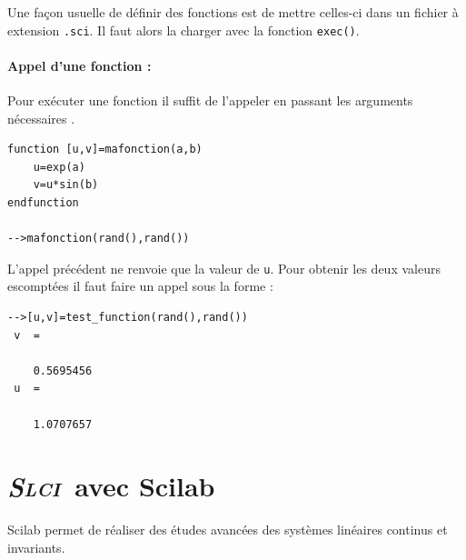 Une façon usuelle de définir des fonctions est de mettre 
celles-ci dans un fichier à extension \verb?.sci?. 
Il faut alors la charger avec la fonction \verb?exec()?.

\paragraph{Appel d'une fonction :}
Pour exécuter une fonction il suffit de l'appeler en passant les arguments nécessaires .
\begin{code}
\begin{verbatim}
function [u,v]=mafonction(a,b)
    u=exp(a)
    v=u*sin(b)
endfunction

-->mafonction(rand(),rand())
\end{verbatim}
\end{code}
L'appel précédent ne renvoie que la valeur de \verb?u?. 
Pour obtenir les deux valeurs escomptées il faut faire un appel sous la forme  :
\begin{code}
\begin{verbatim}
-->[u,v]=test_function(rand(),rand())
 v  =
 
    0.5695456  
 u  =
 
    1.0707657  
\end{verbatim}
\end{code}



\newpage
\section{\emph{{\scshape Slci}}~avec Scilab}

Scilab permet de réaliser des études avancées des systèmes linéaires continus et invariants.


